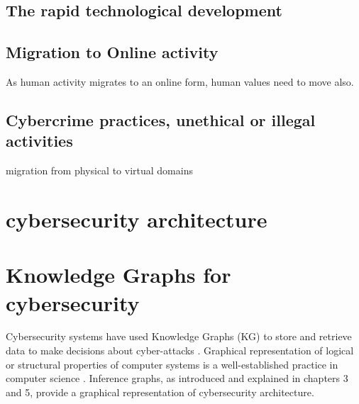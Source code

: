 \subsection {The rapid technological development}

\subsection  {Migration to Online activity}

As human activity migrates to an online form, human values need to move also.
 
\subsection {Cybercrime practices, unethical or illegal activities}

migration from physical to virtual domains

\section{ cybersecurity architecture}
\cite{Rerup2018}
\section{Knowledge Graphs for cybersecurity}
Cybersecurity systems have used Knowledge Graphs (KG) to store and  retrieve data  to make decisions about cyber-attacks 
\iffalse 
We believe that improving the base cyber threat intelligence representation will help improve the overall quality and performance of systems. The dependence of various cybersecurity informatics systems on various knowledge representation schemes makes it imperative that we develop systems that improve these representations. In some cases, a knowledge graph can have incorrect relationships between two cybersecurity entities, or may not even assert a relationship or a few missing relationships. In such a case, we can say that there are a few missing of relationships. we improve knowledge graphs by validating relationships and asserting values for missing relationships \fi \cite{pingle2019relext,jia2018practical, ghose2019multimodal, deng2019knowledge}. Graphical representation of logical or structural properties of computer systems is a well-established practice in computer science \cite{engelen2010integrating}. Inference graphs, as introduced and explained in chapters 3 and 5, provide a graphical representation of cybersecurity architecture.



